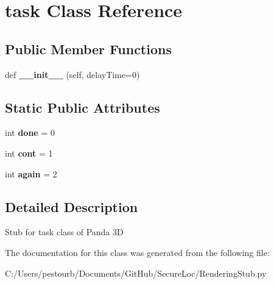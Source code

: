 \hypertarget{class_rendering_stub_1_1task}{}\section{task Class Reference}
\label{class_rendering_stub_1_1task}
\subsection*{Public Member Functions}
\begin{DoxyCompactItemize}
\item 
\mbox{\label{class_rendering_stub_1_1task_ae3242e112db05638dfbaf280c62891a0}} 
def {\bfseries \+\_\+\+\_\+init\+\_\+\+\_\+} (self, delay\+Time=0)
\end{DoxyCompactItemize}
\subsection*{Static Public Attributes}
\begin{DoxyCompactItemize}
\item 
\mbox{\label{class_rendering_stub_1_1task_a5992b274cfdcacdbc1fa8347fd01ebde}} 
int {\bfseries done} = 0
\item 
\mbox{\label{class_rendering_stub_1_1task_a961800bf60ff693820efbf7f4bc72788}} 
int {\bfseries cont} = 1
\item 
\mbox{\label{class_rendering_stub_1_1task_aa5a4ff43956baf880d11d5af36d25674}} 
int {\bfseries again} = 2
\end{DoxyCompactItemize}


\subsection{Detailed Description}
\begin{DoxyVerb}Stub for task class of Panda 3D\end{DoxyVerb}
 

The documentation for this class was generated from the following file\+:\begin{DoxyCompactItemize}
\item 
C\+:/\+Users/pestourb/\+Documents/\+Git\+Hub/\+Secure\+Loc/Rendering\+Stub.\+py\end{DoxyCompactItemize}
